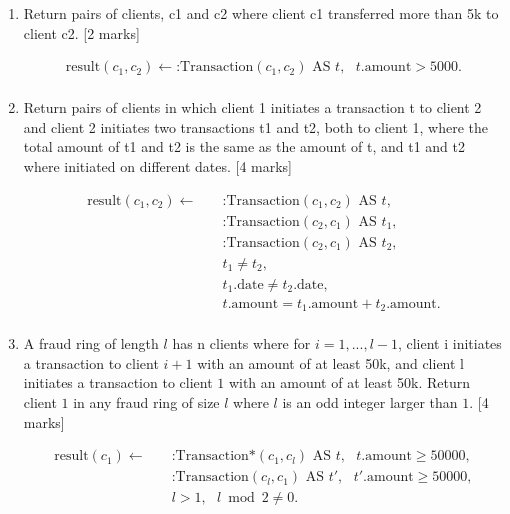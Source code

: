 \documentclass[12pt]{article}
\begin{document}
\begin{enumerate}[label=(\alph*)]
    \item Return pairs of clients, c1 and c2 where client c1 transferred more
    than 5k to client c2. [2 marks]
    
    \begin{equation*}
    \begin{aligned}
        \text{result}(c_1, c_2) \leftarrow \text{:Transaction}(c_1, c_2) \text{ AS } t, \text{ } t.\text{amount} >5000. \\
    \end{aligned}
    \end{equation*}

    \item Return pairs of clients in which client 1 initiates a transaction t
    to client 2 and client 2 initiates two transactions t1 and t2, both
    to client 1, where the total amount of t1 and t2 is the same as the
    amount of t, and t1 and t2 where initiated on different dates.
    [4 marks]

    \begin{equation*}
    \begin{aligned}
        \text{result}(c_1, c_2) \leftarrow \quad
        & \text{:Transaction}(c_1, c_2) \text{ AS }t,              \\
        & \text{:Transaction}(c_2, c_1) \text{ AS }t_1,            \\
        & \text{:Transaction}(c_2, c_1) \text{ AS }t_2,            \\
        & t_1 \neq t_2,                                            \\
        & t_1.\text{date} \neq t_2.\text{date},                    \\
        & t.\text{amount} = t_1.\text{amount} + t_2.\text{amount}. \\
    \end{aligned}
    \end{equation*}

    \item A fraud ring of length $l$ has n clients where for $i = 1, . . . , l - 1$,
    client i initiates a transaction to client $i + 1$ with an amount of
    at least 50k, and client l initiates a transaction to client $1$ with
    an amount of at least 50k.
    Return client $1$ in any fraud ring of size $l$ where $l$ is an odd integer
    larger than $1$. [4 marks]

    \begin{equation*}
    \begin{aligned}
        \text{result}(c_1) \leftarrow \quad 
        & \text{:Transaction*}(c_1, c_l) \text{ AS } t, \text{ } t.\text{amount} \ge 50000, \\
        & \text{:Transaction}(c_l, c_1) \text{ AS } t', \text{ } t'.\text{amount} \ge 50000, \\
        & l > 1, \text{ } l \bmod 2 \neq 0.
    \end{aligned}
    \end{equation*}

\end{enumerate}
\end{document}

